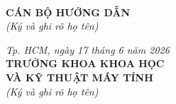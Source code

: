 \vspace{1cm}

\noindent
\begin{minipage}[t]{0.45\textwidth}
\centering
\mbox{}\\[\baselineskip]
\textbf{CÁN BỘ HƯỚNG DẪN}\\
\textit{(Ký và ghi rõ họ tên)}
\vspace{3cm} %
\end{minipage}
\hfill
\begin{minipage}[t]{0.5\textwidth}
\centering
\textit{Tp. HCM, ngày 17 tháng 6 năm 2026}\\[\baselineskip]
\textbf{TRƯỞNG KHOA KHOA HỌC \\
VÀ KỸ THUẬT MÁY TÍNH}\\
\textit{(Ký và ghi rõ họ tên)}
\vspace{3cm} %
\end{minipage}
